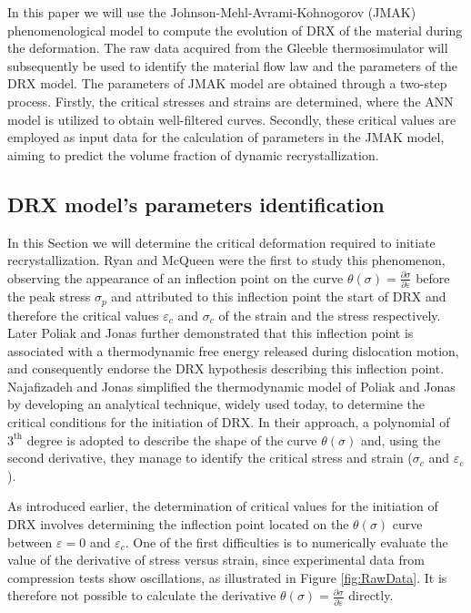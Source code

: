 \documentclass[metals,article,submit,pdftex,moreauthors]{Definitions/mdpi}
\begin{document}
In this paper we will use the Johnson-Mehl-Avrami-Kohnogorov (JMAK) phenomenological model \cite{Avrami-1939} to compute the evolution of DRX of the material during the deformation. The raw data acquired from the Gleeble thermosimulator will subsequently be used to identify the material flow law and the parameters of the DRX model. The parameters of JMAK model are obtained through a two-step process. Firstly, the critical stresses and strains are determined, where the ANN model is utilized to obtain well-filtered curves. Secondly, these critical values are employed as input data for the calculation of parameters in the JMAK model, aiming to predict the volume fraction of dynamic recrystallization.

\subsection{DRX model's parameters identification\label{subsec:DRXParameters}}

In this Section we will determine the critical deformation required to initiate recrystallization.
Ryan and McQueen \cite{Ryan-1989, Ryan-1990, Ryan-1990-2} were the first to study this phenomenon, observing the appearance of an inflection point on the curve $\theta(\sigma)=\frac{\partial \sigma}{\partial \varepsilon}$ before the peak stress $\sigma_p$ and attributed to this inflection point the start of DRX and therefore the critical values $\varepsilon_c$ and $\sigma_c$ of the strain and the stress respectively.
Later Poliak and Jonas \cite{Poliak-1996, Poliak-2003, Poliak-2003-2, Jonas-2003} further demonstrated that this inflection point is associated with a thermodynamic free energy released during dislocation motion, and consequently endorse the DRX hypothesis describing this inflection point.
Najafizadeh and Jonas \cite{Najafizadeh-2006} simplified the thermodynamic model of Poliak and Jonas by developing an analytical technique, widely used today, to determine the critical conditions for the initiation of DRX.
In their approach, a polynomial of $3^\text{th}$ degree is adopted to describe the shape of the curve $\theta(\sigma)$ and, using the second derivative, they manage to identify the critical stress and strain ($\sigma_c$ and $\varepsilon_c$).

As introduced earlier, the determination of critical values for the initiation of DRX involves determining the inflection point located on the $\theta(\sigma)$ curve between $\varepsilon=0$ and $\varepsilon_c$.
One of the first difficulties is to numerically evaluate the value of the derivative of stress versus strain, since experimental data from compression tests show oscillations, as illustrated in Figure \ref{fig:RawData}.
It is therefore not possible to calculate the derivative $\theta(\sigma)=\frac{\partial \sigma}{\partial \varepsilon}$ directly.
\end{document}
